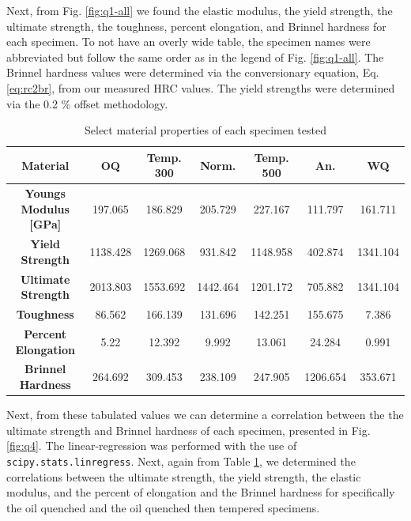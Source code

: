 \documentclass{article}
\begin{document}
Next, from Fig. \ref{fig:q1-all} we found the elastic modulus, the yield strength, the ultimate strength, the toughness, percent elongation, and Brinnel hardness for each specimen. To not have an overly wide table, the specimen names were abbreviated but follow the same order as in the legend of Fig. \ref{fig:q1-all}. The Brinnel hardness values were determined via the conversionary equation, Eq. \ref{eq:rc2br}, from our measured HRC values. The yield strengths were determined via the 0.2 \% offset methodology.

\begin{table}[!h!]
    \centering
    \renewcommand{\arraystretch}{1.5}
    \caption{Select material properties of each specimen tested}
    \begin{tabular}{|c|c|c|c|c|c|c|}
        \toprule
        \hline
        \textbf{Material} & \textbf{OQ} & \textbf{Temp. 300} & \textbf{Norm.} & \textbf{Temp. 500} & \textbf{An.} & \textbf{WQ} \\ 
        \midrule
        \hline 
        \textbf{Youngs Modulus [GPa]} & 197.065 & 186.829 & 205.729 & 227.167 & 111.797 & 161.711 \\ 
        \hline 
        \textbf{Yield Strength} & 1138.428 & 1269.068 & 931.842 & 1148.958 & 402.874 & 1341.104 \\ 
        \hline 
        \textbf{Ultimate Strength} & 2013.803 & 1553.692 & 1442.464 & 1201.172 & 705.882 & 1341.104 \\ 
        \hline 
        \textbf{Toughness} & 86.562 & 166.139 & 131.696 & 142.251 & 155.675 & 7.386 \\ 
        \hline 
        \textbf{Percent Elongation} & 5.22 & 12.392 & 9.992 & 13.061 & 24.284 & 0.991 \\ 
        \hline 
        \textbf{Brinnel Hardness} & 264.692 & 309.453 & 238.109 & 247.905 & 1206.654 & 353.671 \\ 
        \hline 
    \end{tabular}
    \label{tab:q2}
\end{table}

Next, from these tabulated values we can determine a correlation between the  the ultimate strength and Brinnel hardness of each specimen, presented in Fig. \ref{fig:q4}. The linear-regression was performed with the use of \texttt{scipy.stats.linregress}. Next, again from Table \ref{tab:q2}, we determined the correlations between the ultimate strength, the yield strength, the elastic modulus, and the percent of elongation and the Brinnel hardness for specifically the oil quenched and the oil quenched then tempered specimens.
\end{document}
